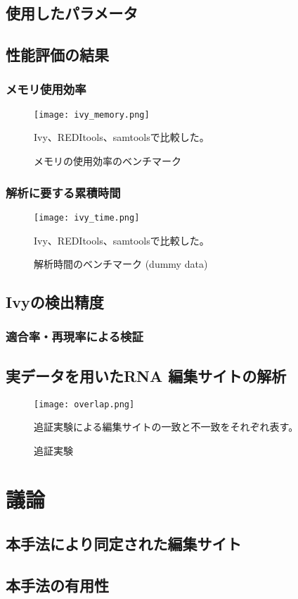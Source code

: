 \subsection{使用したパラメータ}

\subsection{性能評価の結果}
\subsubsection{メモリ使用効率}
\begin{figure}[!h]
	\begin{center}
		\texttt{[image: ivy\_memory.png]}
	\end{center}
	\caption{メモリの使用効率のベンチマーク}
	\begin{flushleft}
		\small{Ivy、REDItools、samtoolsで比較した。}
	\end{flushleft}
	\label{fig:f_measure}
\end{figure}

\subsubsection{解析に要する累積時間}
\begin{figure}[!h]
	\begin{center}
		\texttt{[image: ivy\_time.png]}
	\end{center}
	\caption{解析時間のベンチマーク (dummy data)}
	\begin{flushleft}
		\small{Ivy、REDItools、samtoolsで比較した。}
	\end{flushleft}
	\label{fig:f_measure}
\end{figure}

\subsection{Ivyの検出精度}
\subsubsection{適合率・再現率による検証}

\subsection{実データを用いたRNA 編集サイトの解析}
\begin{figure}[!ht]
	\begin{center}
		\texttt{[image: overlap.png]}
	\end{center}
	\caption{追証実験}
	\begin{flushleft}
		\small{追証実験による編集サイトの一致と不一致をそれぞれ表す。}
	\end{flushleft}
	\label{fig:overlap}
\end{figure}

\newpage

\section{議論}
\subsection{本手法により同定された編集サイト}
\subsection{本手法の有用性}

